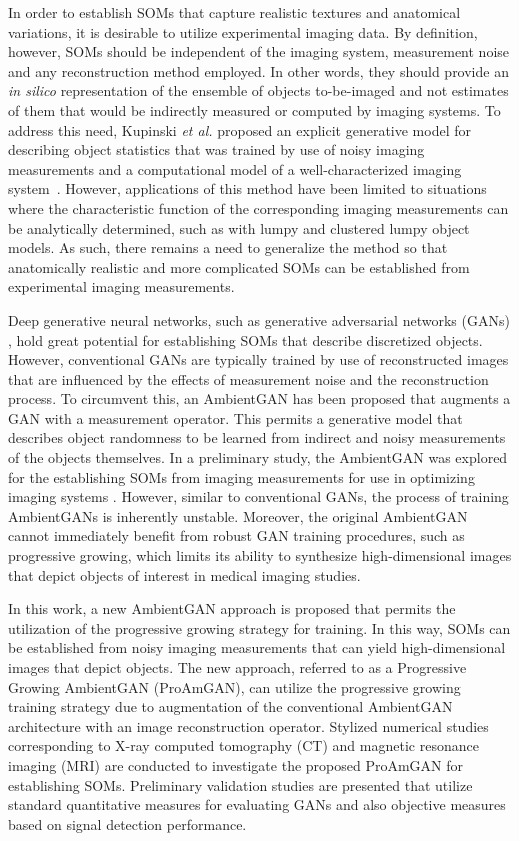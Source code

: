 \documentclass[journal]{IEEEtran}
\begin{document}
In order to establish SOMs that capture realistic textures and anatomical variations,
it is desirable to utilize experimental imaging data.
By definition, however, SOMs should be independent of the imaging system, measurement noise
 and any reconstruction method employed. In other words, they should provide an \emph{in silico}
representation of the ensemble
of objects to-be-imaged and not estimates of them that would be indirectly measured
or computed by imaging systems.  To address this need, 
Kupinski \emph{et al.} \cite{kupinski2003experimental}
proposed an explicit generative model for describing object statistics
 that was trained by use of noisy imaging measurements and a computational model of
a well-characterized imaging system~\cite{kupinski2003experimental}.
However,
applications of this method have been limited to situations
 where the characteristic function of the corresponding imaging measurements can be analytically determined,
such as with lumpy and clustered lumpy object models\cite{kupinski2005small,bochud1999statistical}.
As such, there remains a need
to generalize the method so that anatomically realistic and more complicated SOMs
can be established from experimental imaging measurements.


Deep generative neural networks, such as generative adversarial networks
 (GANs) \cite{goodfellow2014generative}, hold great potential for establishing SOMs
that describe discretized objects.
However, conventional GANs are typically trained by use of reconstructed
 images that are influenced by the effects of measurement noise
 and the reconstruction process.
 To circumvent this, an AmbientGAN has been proposed \cite{bora2018ambientgan} that augments
 a GAN with a measurement operator. This permits
 a generative model that describes object randomness 
 to be learned from indirect and noisy measurements of the objects
themselves.
In a preliminary study, the AmbientGAN was explored
 for the establishing SOMs from imaging measurements for use in optimizing imaging systems \cite{zhou2019learning}.
 However, similar to conventional GANs, the process of training AmbientGANs
is inherently unstable.
Moreover, the original AmbientGAN cannot immediately benefit from
 robust GAN training procedures, such as progressive growing\cite{karras2017progressive},
 which limits its ability to synthesize high-dimensional images that depict
objects of interest in medical imaging studies.

In this work, a new AmbientGAN approach is proposed that permits the
utilization of the progressive growing strategy for training.
In this way, SOMs can be established from noisy imaging measurements that can yield
high-dimensional images that depict objects.
The new approach, referred to as a Progressive Growing AmbientGAN (ProAmGAN),  
can utilize the progressive growing training strategy due to 
augmentation of the conventional AmbientGAN architecture with an image
reconstruction operator.
Stylized numerical studies corresponding to X-ray computed tomography (CT) and
magnetic resonance imaging (MRI) are
conducted to investigate the proposed ProAmGAN for establishing SOMs.
Preliminary validation studies are presented that utilize standard quantitative
measures  for evaluating GANs and also objective measures based on signal detection
performance.
\end{document}
